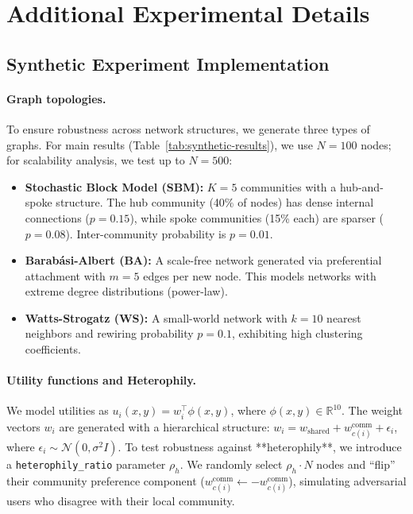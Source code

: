 \documentclass{article}
\theoremstyle{plain}
\theoremstyle{definition}
\theoremstyle{remark}
\begin{document}
\section{Additional Experimental Details}
\label{app:exp-details}

\subsection{Synthetic Experiment Implementation}
\label{app:synthetic-impl}

\paragraph{Graph topologies.}
To ensure robustness across network structures, we generate three types of graphs. For main results (Table~\ref{tab:synthetic-results}), we use $N=100$ nodes; for scalability analysis, we test up to $N=500$:
\begin{itemize}
    \item \textbf{Stochastic Block Model (SBM):} $K=5$ communities with a hub-and-spoke structure. The hub community (40\% of nodes) has dense internal connections ($p=0.15$), while spoke communities (15\% each) are sparser ($p=0.08$). Inter-community probability is $p=0.01$.
    \item \textbf{Barabási-Albert (BA):} A scale-free network generated via preferential attachment with $m=5$ edges per new node. This models networks with extreme degree distributions (power-law).
    \item \textbf{Watts-Strogatz (WS):} A small-world network with $k=10$ nearest neighbors and rewiring probability $p=0.1$, exhibiting high clustering coefficients.
\end{itemize}

\paragraph{Utility functions and Heterophily.}
We model utilities as $u_i(x,y) = w_i^\top \phi(x,y)$, where $\phi(x,y) \in \mathbb{R}^{10}$. The weight vectors $w_i$ are generated with a hierarchical structure:
$w_i = w_{\text{shared}} + w_{c(i)}^{\text{comm}} + \epsilon_i$, where $\epsilon_i \sim \mathcal{N}(0, \sigma^2 I)$.
To test robustness against **heterophily**, we introduce a \texttt{heterophily\_ratio} parameter $\rho_h$. We randomly select $\rho_h \cdot N$ nodes and ``flip'' their community preference component ($w_{c(i)}^{\text{comm}} \leftarrow -w_{c(i)}^{\text{comm}}$), simulating adversarial users who disagree with their local community.
\end{document}
